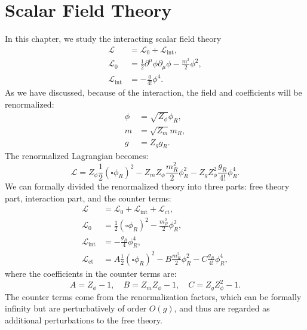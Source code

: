 \chapter{Scalar Field Theory}

In this chapter, we study the interacting scalar field theory
\begin{equation}
\begin{aligned}
	\mathcal L &= \mathcal L_0 + \mathcal L_{\mathrm{int}}, \\
	\mathcal L_0 &=\frac{1}{2}\partial^\mu \phi \partial_\mu \phi -\frac{m^2}{2}\phi^2, \\
	\mathcal L_{\mathrm{int}} &= -\frac{g}{4!}\phi^4.
\end{aligned}
\end{equation}
As we have discussed, because of the interaction, the field and coefficients will be renormalized:
\begin{equation}
\begin{aligned}
	\phi &= \sqrt{Z_\phi} \phi_R, \\
	m &= \sqrt{Z_m} m_R, \\
	g &= Z_g g_R.
\end{aligned}
\end{equation}
The renormalized Lagrangian becomes:
\begin{equation}
	\mathcal{L}
	= Z_\phi \frac{1}{2} (\square\phi_R)^2 - Z_m Z_\phi \frac{m_R^2}{2} \phi_R^2 - Z_g Z_\phi^2 \frac{g_R}{4!}\phi_R^4.
\end{equation}
We can formally divided the renormalized theory into three parts: free theory part, interaction part, and the counter terms:
\begin{equation}
\begin{aligned}
	\mathcal L &= \mathcal L_0 + \mathcal L_{\mathrm{int}} + \mathcal L_{\mathrm{ct}}, \\
	\mathcal L_0 &= \frac{1}{2} (\square\phi_R)^2 - \frac{ m_R^2}{2} \phi_R^2, \\
	\mathcal L_{\mathrm{int}} &= -\frac{g_R}{4}\phi_R^4, \\
	\mathcal L_{\mathrm{ct}} &= A \frac{1}{2} (\square\phi_R)^2 - B\frac{ m_R^2}{2} \phi_R^2 - C \frac{g_R}{4!} \phi_R^4,
\end{aligned}
\end{equation}
where the coefficients in the counter terms are:
\begin{equation}
	A = Z_\phi-1, \quad 
	B = Z_m Z_\phi - 1, \quad 
	C = Z_g Z_\phi^2 - 1.
\end{equation}
The counter terms come from the renormalization factors, which can be formally infinity but are perturbatively of order $O(g)$, and thus are regarded as additional perturbations to the free theory.





